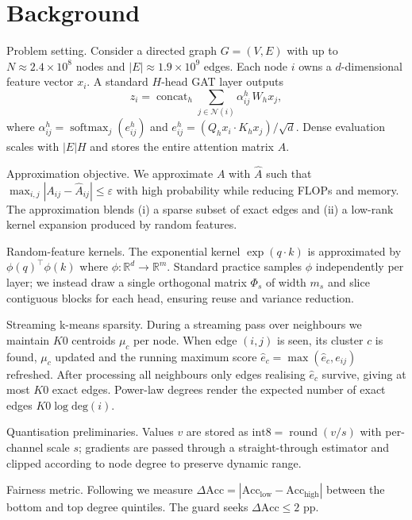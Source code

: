 \documentclass{article} %
\begin{document}
\section{Background}
\label{sec:background}
Problem setting. Consider a directed graph \(G=(V,E)\) with up to \(N \approx 2.4 \times 10^8\) nodes and \(|E| \approx 1.9 \times 10^9\) edges. Each node \(i\) owns a \(d\)-dimensional feature vector \(x_i\). A standard \(H\)-head GAT layer outputs
\[
  z_i = \operatorname{concat}_h \sum_{j\in \mathcal{N}(i)} \alpha_{ij}^h \, W_h x_j,
\]
where \(\alpha_{ij}^h = \operatorname{softmax}_j(e_{ij}^h)\) and \(e_{ij}^h = (Q_h x_i \cdot K_h x_j)/\sqrt{d}.\) Dense evaluation scales with \(|E|H\) and stores the entire attention matrix \(A\).

Approximation objective. We approximate \(A\) with \(\hat{A}\) such that \(\max_{i,j}|A_{ij}-\hat{A}_{ij}| \le \varepsilon\) with high probability while reducing FLOPs and memory. The approximation blends (i) a sparse subset of exact edges and (ii) a low-rank kernel expansion produced by random features.

Random-feature kernels. The exponential kernel \(\exp(q\cdot k)\) is approximated by \(\phi(q)^\top\phi(k)\) where \(\phi:\mathbb{R}^d\to\mathbb{R}^m\). Standard practice samples \(\phi\) independently per layer; we instead draw a single orthogonal matrix \(\Phi_s\) of width \(m_s\) and slice contiguous blocks for each head, ensuring reuse and variance reduction.

Streaming k-means sparsity. During a streaming pass over neighbours we maintain \(K0\) centroids \(\mu_c\) per node. When edge \((i,j)\) is seen, its cluster \(c\) is found, \(\mu_c\) updated and the running maximum score \(\hat{e}_c = \max(\hat{e}_c,e_{ij})\) refreshed. After processing all neighbours only edges realising \(\hat{e}_c\) survive, giving at most \(K0\) exact edges. Power-law degrees render the expected number of exact edges \(K0 \log \mathrm{deg}(i)\).

Quantisation preliminaries. Values \(v\) are stored as \(\mathrm{int8} = \operatorname{round}(v/s)\) with per-channel scale \(s\); gradients are passed through a straight-through estimator and clipped according to node degree to preserve dynamic range.

Fairness metric. Following \cite{tailor-2020-degree} we measure \(\Delta \mathrm{Acc} = |\mathrm{Acc}_{\mathrm{low}} - \mathrm{Acc}_{\mathrm{high}}|\) between the bottom and top degree quintiles. The guard seeks \(\Delta \mathrm{Acc} \le 2\) pp.
\end{document}
